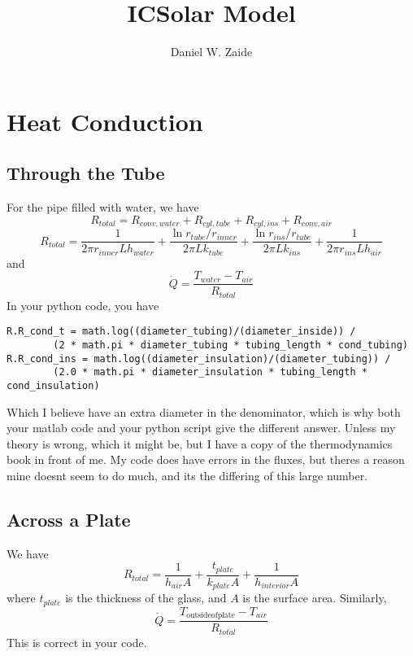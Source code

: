 \documentclass[11pt]{article}
\title{ICSolar Model}
\author{Daniel W. Zaide}
\begin{document}
\maketitle
\section{Heat Conduction}
\subsection{Through the Tube}
For the pipe filled with water, we have
\[ R_{total} = R_{conv,water} + R_{cyl,tube} + R_{cyl,ins} + R_{conv,air} \]
\[ R_{total} = \frac{1}{2\pi r_{inner} Lh_{water}} + \frac{\ln r_{tube}/r_{inner}}{2\pi L k_{tube}} + \frac{\ln r_{ins}/r_{tube} }{2\pi L k_{ins}}+ \frac{1}{2\pi r_{ins} Lh_{air}}\]
and 
\[ \dot{Q} = \frac{T_{water}-T_{air}}{R_{total}} \]
In your python code, you have
\begin{lstlisting}
R.R_cond_t = math.log((diameter_tubing)/(diameter_inside)) / 
		(2 * math.pi * diameter_tubing * tubing_length * cond_tubing)    
R.R_cond_ins = math.log((diameter_insulation)/(diameter_tubing)) / 
		(2.0 * math.pi * diameter_insulation * tubing_length * cond_insulation)  
\end{lstlisting}
Which I believe have an extra diameter in the denominator, which is why both your matlab code and your python script give the different answer. Unless my theory is wrong, which it might be, but I have a copy of the thermodynamics book in front of me. My code does have errors in the fluxes, but theres a reason mine doesnt seem to do much, and its the differing of this large number.
\subsection{Across a Plate}
We have \[ R_{total} = \frac{1}{h_{air}A} + \frac{t_{plate}}{k_{plate}A} + \frac{1}{h_{interior}A} \] where $t_{plate}$ is the thickness of the glass, and $A$ is the surface area. Similarly,
\[ \dot{Q} = \frac{T_{\mathrm{outside of plate}}-T_{air}}{R_{total}} \]
This is correct in your code.
\end{document}
